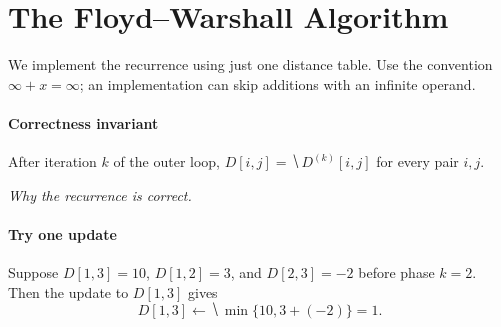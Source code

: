 \documentclass[11  pt]{article}
\begin{document}
\vspace{2in}

\section{The Floyd--Warshall Algorithm}
We implement the recurrence using just one distance table.
Use the convention $\infty+x=\infty$; an implementation can skip additions
with an infinite operand.

\medskip
\noindent{}

\paragraph{Correctness invariant}
After iteration $k$ of the outer loop, $D[i,j]=\hide{D^{(k)}[i,j]}$
for every pair $i,j$.

\textit{Why the recurrence is correct.}

\vspace{3in}



\paragraph{Try one update}
Suppose $D[1,3]=10$, $D[1,2]=3$, and $D[2,3]=-2$ before phase $k=2$.
Then the update to $D[1,3]$ gives
\[
 D[1,3]\gets\hide{\min\{10,3+(-2)\}=1.}
\]
\end{document}
